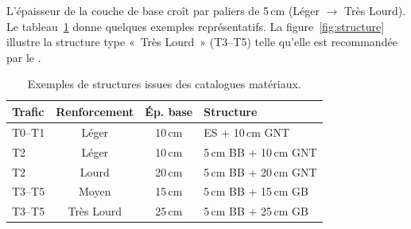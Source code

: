 L'épaisseur de la couche de base croît par paliers de 5\,cm
(Léger $\to$ Très Lourd). Le tableau~\ref{tab:structures} donne
quelques exemples représentatifs. La figure~\ref{fig:structure}
illustre la structure type «~Très Lourd~» (T3--T5) telle
qu'elle est recommandée par le \cttp{}.

\begin{table}[H]
\centering
\caption{Exemples de structures issues des catalogues matériaux.}
\label{tab:structures}
\begin{tabular}{@{}lccp{5.6cm}@{}}
\toprule
\bfseries Trafic & \bfseries Renforcement & \bfseries Ép. base & \bfseries Structure \\
\midrule
T0--T1 & Léger      & 10\,cm & ES + 10\,cm GNT \\
T2     & Léger      & 10\,cm & 5\,cm BB + 10\,cm GNT \\
T2     & Lourd      & 20\,cm & 5\,cm BB + 20\,cm GNT \\
T3--T5 & Moyen      & 15\,cm & 5\,cm BB + 15\,cm GB \\
T3--T5 & Très Lourd & 25\,cm & 5\,cm BB + 25\,cm GB \\
\bottomrule
\end{tabular}
\end{table}

